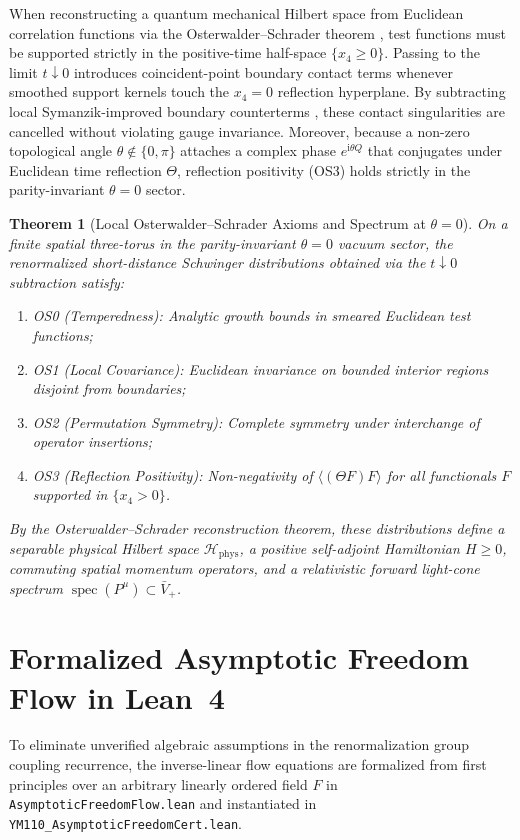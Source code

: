 \documentclass[11pt,a4paper]{article}
\newtheorem{theorem}{Theorem}[section]
\begin{document}
When reconstructing a quantum mechanical Hilbert space from Euclidean correlation functions via the Osterwalder--Schrader theorem \cite{OsterwalderSchrader1973,OsterwalderSchrader1975}, test functions must be supported strictly in the positive-time half-space $\{x_4 \ge 0\}$. Passing to the limit $t \downarrow 0$ introduces coincident-point boundary contact terms whenever smoothed support kernels touch the $x_4 = 0$ reflection hyperplane. By subtracting local Symanzik-improved boundary counterterms \cite{Symanzik1983}, these contact singularities are cancelled without violating gauge invariance. Moreover, because a non-zero topological angle $\theta \notin \{0, \pi\}$ attaches a complex phase $e^{\mathrm{i}\theta Q}$ that conjugates under Euclidean time reflection $\Theta$, reflection positivity (OS3) holds strictly in the parity-invariant $\theta = 0$ sector.

\begin{theorem}[Local Osterwalder--Schrader Axioms and Spectrum at $\theta = 0$]
On a finite spatial three-torus in the parity-invariant $\theta = 0$ vacuum sector, the renormalized short-distance Schwinger distributions obtained via the $t \downarrow 0$ subtraction satisfy:
\begin{enumerate}
\item \emph{OS0 (Temperedness):} Analytic growth bounds in smeared Euclidean test functions;
\item \emph{OS1 (Local Covariance):} Euclidean invariance on bounded interior regions disjoint from boundaries;
\item \emph{OS2 (Permutation Symmetry):} Complete symmetry under interchange of operator insertions;
\item \emph{OS3 (Reflection Positivity):} Non-negativity of $\langle (\Theta F) F \rangle$ for all functionals $F$ supported in $\{x_4 > 0\}$.
\end{enumerate}
By the Osterwalder--Schrader reconstruction theorem, these distributions define a separable physical Hilbert space $\mathcal{H}_{\mathrm{phys}}$, a positive self-adjoint Hamiltonian $H \ge 0$, commuting spatial momentum operators, and a relativistic forward light-cone spectrum $\operatorname{spec}(P^\mu) \subset \bar{V}_+$.
\end{theorem}

\section{Formalized Asymptotic Freedom Flow in Lean~4}
To eliminate unverified algebraic assumptions in the renormalization group coupling recurrence, the inverse-linear flow equations are formalized from first principles over an arbitrary linearly ordered field $F$ in \texttt{AsymptoticFreedomFlow.lean} and instantiated in \texttt{YM110\_\-AsymptoticFreedomCert.lean}.
\end{document}
